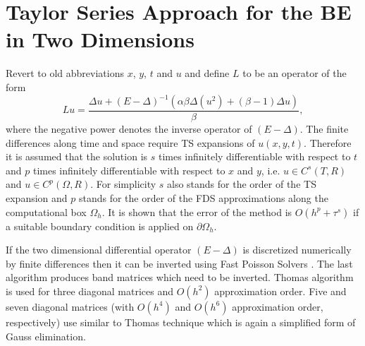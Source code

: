 \documentclass[11pt,a4paper,twoside]{article}
\begin{document}
\section{Taylor Series Approach for the BE in Two Dimensions}\label{TaylorA}

Revert to old abbreviations $x$, $y$, $t$ and $u$ and define $L$ to be an operator of the form
\begin{equation}\label{operator}
Lu = \frac{\Delta u + (E-\Delta)^{-1} ( \alpha \beta \Delta( u^2) + (\beta -1)\Delta u)}{\beta},
\end{equation}
where the negative power denotes the inverse operator of $(E-\Delta)$. The finite differences along time and space require TS expansions of $u(x,y,t)$. Therefore it is assumed that the solution is $s$ times infinitely differentiable with respect to $t$ and $p$ times infinitely differentiable with respect to $x$ and $y$, i.e. $u \in C^s(T, R)$ and $u \in C^p(\Omega, R)$. For simplicity $s$ also stands for the order of the TS expansion and $p$ stands for the order of the FDS approximations along the computational box $\Omega_h$. It is shown that the error of the method is $O(h^p + \tau^s)$ if a suitable boundary condition is applied on $\partial \Omega_h$.

If the two dimensional differential operator $(E-\Delta)$ is discretized numerically by finite differences then it can be inverted using Fast Poisson Solvers \cite{FPS}. The last algorithm produces band matrices which need to be inverted. Thomas algorithm is used for three diagonal matrices and $O(h^2)$ approximation order.  Five and seven diagonal matrices (with $O(h^4)$ and $O(h^6)$ approximation order, respectively) use similar to Thomas technique which is again a simplified form of Gauss elimination.
\end{document}

